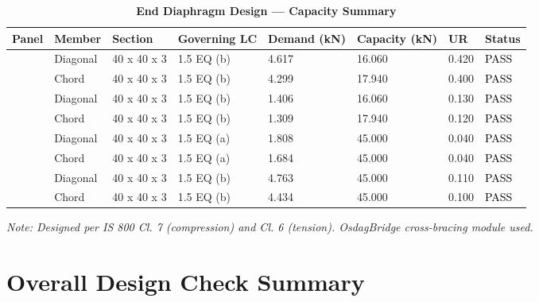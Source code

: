 \documentclass[12pt,a4paper]{report}
\numberwithin{table}{chapter}
\numberwithin{figure}{chapter}
\begin{document}
\begin{longtable}{|C{2.0cm}|L{1.8cm}|C{2.2cm}|C{3.0cm}|C{1.8cm}|C{1.8cm}|C{1.2cm}|C{1.8cm}|}
\caption{\textbf{End Diaphragm Design --- Capacity Summary}}
\hline
\textbf{Panel} & \textbf{Member} & \textbf{Section} & \textbf{Governing LC} & \textbf{Demand (kN)} & \textbf{Capacity (kN)} & \textbf{UR} & \textbf{Status} \\[6pt]
\hline
{} & Diagonal & 40 x 40 x 3 & 1.5 EQ (b) & 4.617 & 16.060 & 0.420 & \textcolor{black}{PASS} \\[6pt]
 & Chord & 40 x 40 x 3 & 1.5 EQ (b) & 4.299 & 17.940 & 0.400 & \textcolor{black}{PASS} \\[6pt]
\hline
{} & Diagonal & 40 x 40 x 3 & 1.5 EQ (b) & 1.406 & 16.060 & 0.130 & \textcolor{black}{PASS} \\[6pt]
 & Chord & 40 x 40 x 3 & 1.5 EQ (b) & 1.309 & 17.940 & 0.120 & \textcolor{black}{PASS} \\[6pt]
\hline
{} & Diagonal & 40 x 40 x 3 & 1.5 EQ (a) & 1.808 & 45.000 & 0.040 & \textcolor{black}{PASS} \\[6pt]
 & Chord & 40 x 40 x 3 & 1.5 EQ (a) & 1.684 & 45.000 & 0.040 & \textcolor{black}{PASS} \\[6pt]
\hline
{} & Diagonal & 40 x 40 x 3 & 1.5 EQ (b) & 4.763 & 45.000 & 0.110 & \textcolor{black}{PASS} \\[6pt]
 & Chord & 40 x 40 x 3 & 1.5 EQ (b) & 4.434 & 45.000 & 0.100 & \textcolor{black}{PASS} \\[6pt]
\hline
\end{longtable}
\noindent\textit{Note: Designed per IS 800 Cl. 7 (compression) and Cl. 6 (tension). OsdagBridge cross-bracing module used.}

\section{Overall Design Check Summary}
\label{sec:overall-summary}
\end{document}
